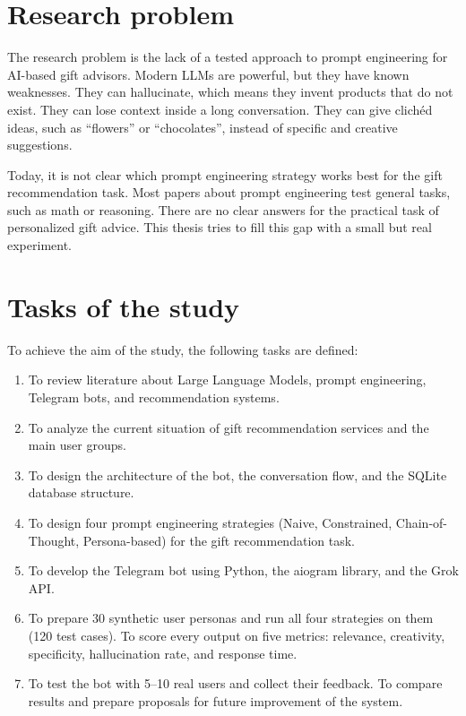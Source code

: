 \section*{Research problem}

The research problem is the lack of a tested approach to prompt engineering for AI-based gift advisors. Modern LLMs are powerful, but they have known weaknesses. They can hallucinate, which means they invent products that do not exist. They can lose context inside a long conversation. They can give clichéd ideas, such as ``flowers'' or ``chocolates'', instead of specific and creative suggestions.

Today, it is not clear which prompt engineering strategy works best for the gift recommendation task. Most papers about prompt engineering test general tasks, such as math or reasoning. There are no clear answers for the practical task of personalized gift advice. This thesis tries to fill this gap with a small but real experiment.

\section*{Tasks of the study}

To achieve the aim of the study, the following tasks are defined:

\begin{enumerate}
    \item To review literature about Large Language Models, prompt engineering, Telegram bots, and recommendation systems.
    \item To analyze the current situation of gift recommendation services and the main user groups.
    \item To design the architecture of the bot, the conversation flow, and the SQLite database structure.
    \item To design four prompt engineering strategies (Naive, Constrained, Chain-of-Thought, Persona-based) for the gift recommendation task.
    \item To develop the Telegram bot using Python, the aiogram library, and the Grok API.
    \item To prepare 30 synthetic user personas and run all four strategies on them (120 test cases). To score every output on five metrics: relevance, creativity, specificity, hallucination rate, and response time.
    \item To test the bot with 5--10 real users and collect their feedback. To compare results and prepare proposals for future improvement of the system.
\end{enumerate}

